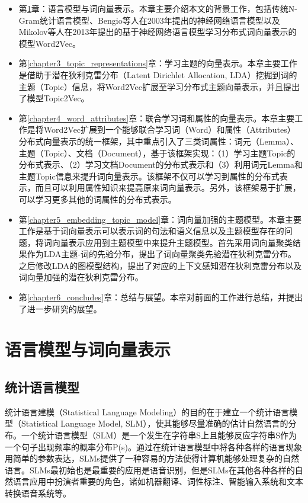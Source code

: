 \documentclass[master]{njuthesis}
\begin{document}
\begin{itemize}
\item 第\ref{chapter2_nnlm_word_representations}章：语言模型与词向量表示。本章主要介绍本文的背景工作，包括传统N-Gram统计语言模型、Bengio等人在2003年提出的神经网络语言模型\cite{bengio2003neural}以及Mikolov等人在2013年提出的基于神经网络语言模型学习分布式词向量表示的模型Word2Vec\cite{mikolov2013efficient,mikolov2013distributed,mikolov2013linguistic}。
\item 第\ref{chapter3_topic_representations}章：学习主题的向量表示。本章主要工作是借助于潜在狄利克雷分布（Latent Dirichlet Allocation, LDA）挖掘到词的主题（Topic）信息，将Word2Vec扩展至学习分布式主题向量表示，并且提出了模型Topic2Vec。
\item 第\ref{chapter4_word_attributes}章：联合学习词和属性的向量表示。本章主要工作是将Word2Vec扩展到一个能够联合学习词（Word）和属性（Attributes）分布式向量表示的统一框架，其中重点引入了三类词属性：词元（Lemma）、主题（Topic）、文档（Document），基于该框架实现：（1）学习主题Topic的分布式表示、（2）学习文档Document的分布式表示和（3）利用词元Lemma和主题Topic信息来提升词向量表示。该框架不仅可以学习到属性的分布式表示，而且可以利用属性知识来提高原来词向量表示。另外，该框架易于扩展，可以学习更多其他的词属性的分布式表示。
\item 第\ref{chapter5_embedding_topic_model}章：词向量加强的主题模型。本章主要工作是基于词向量表示可以表示词的句法和语义信息以及主题模型存在的问题，将词向量表示应用到主题模型中来提升主题模型。首先采用词向量聚类结果作为LDA主题-词的先验分布，提出了词向量聚类先验潜在狄利克雷分布。之后修改LDA的图模型结构，提出了对应的上下文感知潜在狄利克雷分布以及词向量加强的潜在狄利克雷分布。
\item 第\ref{chapter6_concludes}章：总结与展望。本章对前面的工作进行总结，并提出了进一步研究的展望。

\end{itemize}



\chapter{语言模型与词向量表示}\label{chapter2_nnlm_word_representations}

\section{统计语言模型}\label{sec_chap2_lm}

统计语言建模（Statistical Language Modeling）的目的在于建立一个统计语言模型（Statistical Language Model, SLM），使其能够尽量准确的估计自然语言的分布。一个统计语言模型（SLM）是一个发生在字符串S上且能够反应字符串S作为一个句子出现频率的概率分布P(s)。通过在统计语言模型中将各种各样的语言现象用简单的参数表达，SLMs提供了一种容易的方法使得计算机能够处理复杂的自然语言。SLMs最初始也是最重要的应用是语音识别，但是SLMs在其他各种各样的自然语言应用中扮演者重要的角色，诸如机器翻译、词性标注、智能输入系统和文本转换语音系统等。
\end{document}
